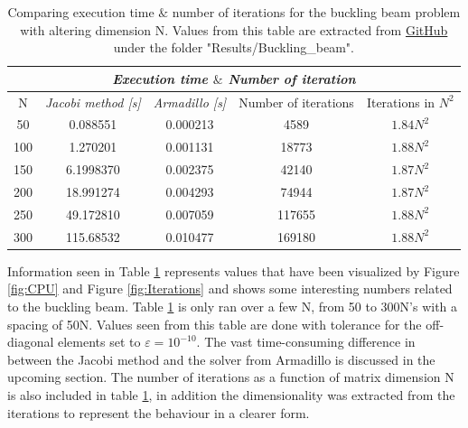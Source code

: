 \documentclass[twoside,onecolumn]{article}
\begin{document}

\begin{table}[H]
\centering
\caption{Comparing execution time $\&$ number of iterations for the buckling beam problem with altering dimension N. Values from this table are extracted from \textcolor{red}{\href{https://github.com/patrykpk/FYS4150/tree/master/Project_2}{GitHub}} under the folder "Results/Buckling{\_}beam".}
\label{tab:buckling_beam}
\begin{tabular}{|c|c|c|c|c|}
\hline
\multicolumn{5}{|c|}{\textit{\textbf{Execution time  $\&$ Number of iteration }}} \\ \hline
N & \textit{Jacobi method [s]} & \textit{Armadillo [s]} & Number of iterations & Iterations in $N^2$ \\ \hline
50 & 0.088551 & 0.000213 & 4589 & $1.84N^2$   \\ \hline
100 & 1.270201 & 0.001131 & 18773 & $1.88N^2$    \\ \hline
150 & 6.1998370 & 0.002375 & 42140 & $1.87N^2$   \\ \hline
200 & 18.991274 & 0.004293 & 74944 & $1.87N^2$ \\ \hline
250 & 49.172810 & 0.007059 & 117655 & $1.88N^2$    \\ \hline
300 & 115.68532 & 0.010477 & 169180 & $1.88N^2$  \\ \hline
\end{tabular}
\end{table}


Information seen in Table \ref{tab:buckling_beam} represents values that have been visualized by Figure \ref{fig:CPU} and Figure \ref{fig:Iterations} and shows some interesting numbers related to the buckling beam. Table \ref{tab:buckling_beam} is only ran over a few N, from 50 to 300N's with a spacing of 50N. Values seen from this table are done with tolerance for the off-diagonal elements set to $\varepsilon=10^{-10}$. The vast time-consuming difference in between the Jacobi method and the solver from Armadillo is discussed in the upcoming section. The number of iterations as a function of matrix dimension N is also included in table \ref{tab:buckling_beam}, in addition the dimensionality was extracted from the iterations to represent the behaviour in a clearer form.
\end{document}
